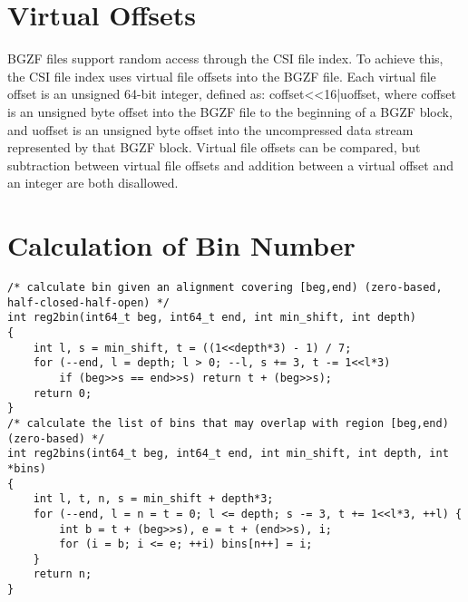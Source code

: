 \documentclass[10pt]{article}
\begin{document}
\section{Virtual Offsets}
BGZF files support random access through the CSI file index.
To achieve this, the CSI file index uses virtual file offsets into the
BGZF file. Each virtual file offset is an unsigned 64-bit integer, defined
as: coffset<<16|uoffset, where coffset is an unsigned byte offset into
the BGZF file to the beginning of a BGZF block, and uoffset is an
unsigned byte offset into the uncompressed data stream represented
by that BGZF block. Virtual file offsets can be compared, but
subtraction between virtual file offsets and addition between a virtual
offset and an integer are both disallowed.

\section{Calculation of Bin Number}

{\footnotesize
\begin{verbatim}
/* calculate bin given an alignment covering [beg,end) (zero-based, half-closed-half-open) */
int reg2bin(int64_t beg, int64_t end, int min_shift, int depth)
{
    int l, s = min_shift, t = ((1<<depth*3) - 1) / 7;
    for (--end, l = depth; l > 0; --l, s += 3, t -= 1<<l*3)
        if (beg>>s == end>>s) return t + (beg>>s);
    return 0;
}
/* calculate the list of bins that may overlap with region [beg,end) (zero-based) */
int reg2bins(int64_t beg, int64_t end, int min_shift, int depth, int *bins)
{
    int l, t, n, s = min_shift + depth*3;
    for (--end, l = n = t = 0; l <= depth; s -= 3, t += 1<<l*3, ++l) {
        int b = t + (beg>>s), e = t + (end>>s), i;
        for (i = b; i <= e; ++i) bins[n++] = i;
    }
    return n;
}
\end{verbatim}
}
\end{document}
